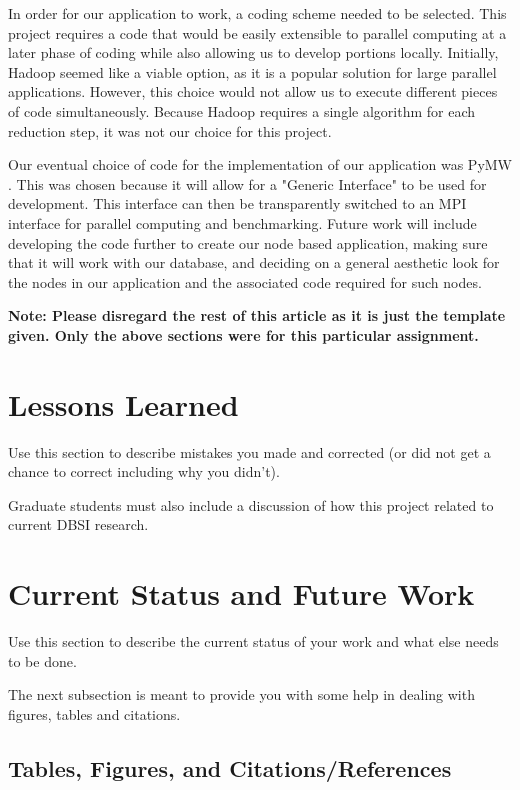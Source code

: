 \documentclass{sig-alternate}
\begin{document}
In order for our application to work, a coding scheme needed to be selected. This project 
requires a code that would be easily extensible to parallel computing at a later phase of 
coding while also allowing us to develop portions locally. Initially, Hadoop seemed like 
a viable option, as it is a popular solution for large parallel applications. However, 
this choice would not allow us to execute different pieces of code simultaneously. Because 
Hadoop requires a single algorithm for each reduction step, it was not our choice for this project. 

Our eventual choice of code for the implementation of our application was PyMW \cite {ieee5161132}. 
This was chosen because it will allow for a "Generic Interface" to be used for development. 
This interface can then be transparently switched to an MPI interface for parallel computing and 
benchmarking. Future work will include developing the code further to create our node based 
application, making sure that it will work with our database, and deciding on a general 
aesthetic look for the nodes in our application and the associated code required for such nodes. 

{\bf Note: Please disregard the rest of this article as it is just
the template given. Only the above sections were 
for this particular assignment.}


\section{Lessons Learned}
\label{mistakes}

Use this section to describe mistakes you made and corrected (or did
not get a chance to correct including why you didn't).

Graduate students must also include a discussion of how this project
related to current DBSI research.

\section{Current Status and Future Work}
\label{current status}

Use this section to describe the current status of your work
and what else needs to be done.

The next subsection is meant to provide you with some help
in dealing with figures, tables and citations.

\subsection{Tables, Figures, and Citations/References}
\end{document}
